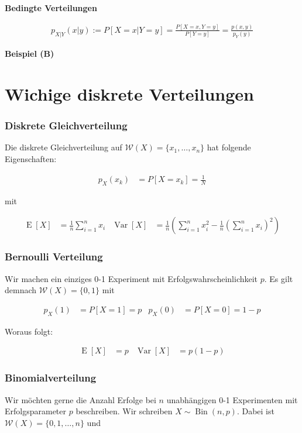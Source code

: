 \documentclass[25pt]{sciposter}
\newcommand{\W}{\mathcal{W}}
\newcommand{\Var}{\operatorname{Var}}
\newcommand{\E}{\operatorname{E}}
\newenvironment{method}[1]{\begin{mdframed}[backgroundcolor=blue!10,innertopmargin=15pt, innerbottommargin=15pt,nobreak=true]
		\textbf{#1 }
	}
	{ 
	\end{mdframed}
}
\begin{document}
\begin{multicols}{3}
\begin{method}{Bedingte Verteilungen}
	\begin{align*}
		p_{X|Y} (x|y) := P[X=x | Y=y] = \frac{P[X=x, Y=y]}{P[Y=y]} = \frac{p(x,y)}{p_Y(y)}
	\end{align*}
\end{method}

\textbf{Beispiel (B)}


\section{Wichige diskrete Verteilungen}

\subsubsection*{Diskrete Gleichverteilung}
Die diskrete Gleichverteilung auf  $\W(X)=\{x_1,\ldots,x_n\}$ hat folgende Eigenschaften:

\begin{align*}
	p_X(x_k) &= P[X = x_k] = \frac{1}{N}
\end{align*}

mit 

\begin{align*}
	\operatorname {E}[X]&={\frac  {1}{n}}\sum _{{i=1}}^{n}x_{i} & \operatorname {Var}[X]&={\frac  {1}{n}}\left(\sum _{{i=1}}^{n}x_{i}^{2}-{\frac  {1}{n}}\left(\sum _{{i=1}}^{n}x_{i}\right)^{2}\right)
\end{align*}

\subsubsection*{Bernoulli Verteilung}
Wir machen ein einziges 0-1 Experiment mit Erfolgswahrscheinlichkeit $p$. Es gilt demnach $\W(X) = \{0,1\}$ mit 

\begin{align*}
	p_X(1) &= P[X=1] = p & 	p_X(0) &= P[X=0] = 1-p
\end{align*}

Woraus folgt:

\begin{align*}
	\E[X] &= p & \Var[X] &= p(1-p)
\end{align*}

\subsubsection*{Binomialverteilung}
Wir möchten gerne die Anzahl Erfolge bei $n$ unabhängigen 0-1 Experimenten mit Erfolgsparameter $p$ beschreiben. Wir schreiben $X \sim \operatorname{Bin}(n,p)$. Dabei ist $\W(X) = \{0,1,\ldots,n\}$ und 


\end{multicols}
\end{document}
